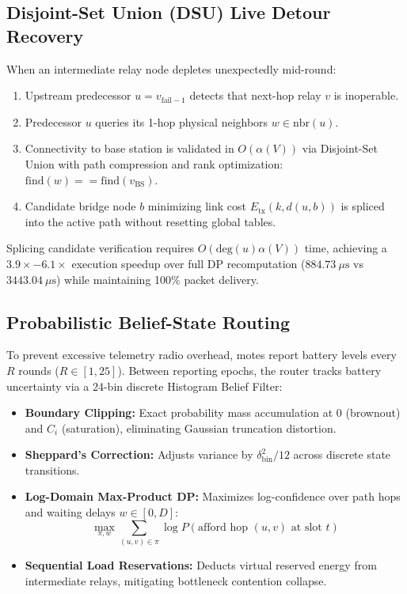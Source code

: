 \documentclass[conference]{IEEEtran}
\begin{document}
\subsection{Disjoint-Set Union (DSU) Live Detour Recovery}
When an intermediate relay node depletes unexpectedly mid-round:
\begin{enumerate}
    \item Upstream predecessor $u = v_{\text{fail}-1}$ detects that next-hop relay $v$ is inoperable.
    \item Predecessor $u$ queries its 1-hop physical neighbors $w \in \text{nbr}(u)$.
    \item Connectivity to base station is validated in $O(\alpha(V))$ via Disjoint-Set Union with path compression and rank optimization: $\text{find}(w) == \text{find}(v_{\text{BS}})$.
    \item Candidate bridge node $b$ minimizing link cost $E_{\text{tx}}(k, d(u, b))$ is spliced into the active path without resetting global tables.
\end{enumerate}
Splicing candidate verification requires $O(\text{deg}(u)\alpha(V))$ time, achieving a $3.9\times - 6.1\times$ execution speedup over full DP recomputation ($884.73\ \mu\text{s}$ vs $3443.04\ \mu\text{s}$) while maintaining 100\% packet delivery.

\subsection{Probabilistic Belief-State Routing}
To prevent excessive telemetry radio overhead, motes report battery levels every $R$ rounds ($R \in [1, 25]$). Between reporting epochs, the router tracks battery uncertainty via a 24-bin discrete Histogram Belief Filter:
\begin{itemize}
    \item \textbf{Boundary Clipping:} Exact probability mass accumulation at 0 (brownout) and $C_i$ (saturation), eliminating Gaussian truncation distortion.
    \item \textbf{Sheppard's Correction:} Adjusts variance by $\delta_{\text{bin}}^2 / 12$ across discrete state transitions.
    \item \textbf{Log-Domain Max-Product DP:} Maximizes log-confidence over path hops and waiting delays $w \in [0, D]$:
    \begin{equation}
    \max_{\pi, w} \sum_{(u, v) \in \pi} \log P(\text{afford hop } (u, v) \text{ at slot } t)
    \end{equation}
    \item \textbf{Sequential Load Reservations:} Deducts virtual reserved energy from intermediate relays, mitigating bottleneck contention collapse.
\end{itemize}
\end{document}
